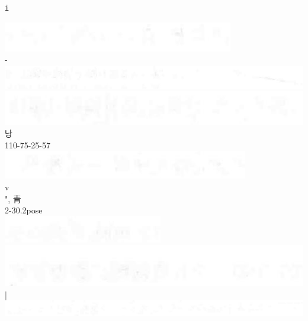 \documentclass[10pt]{article}
\begin{document}
\begin{verbatim}
i
\end{verbatim}

\includegraphics[max width=\textwidth, center]{2025_06_06_704745ea57b15b2333e5g-111(20)}\\
-\\
\includegraphics[max width=\textwidth, center]{2025_06_06_704745ea57b15b2333e5g-111(9)}\\
\includegraphics[max width=\textwidth, center]{2025_06_06_704745ea57b15b2333e5g-111(12)}\\
낭\\
110-75-25-57\\
\includegraphics[max width=\textwidth, center]{2025_06_06_704745ea57b15b2333e5g-111(17)}\\
v\\
", 青\\
2-30.2pose\\
\includegraphics[max width=\textwidth, center]{2025_06_06_704745ea57b15b2333e5g-111(11)}\\
\includegraphics[max width=\textwidth, center]{2025_06_06_704745ea57b15b2333e5g-111(7)}\\
|\\
\includegraphics[max width=\textwidth, center]{2025_06_06_704745ea57b15b2333e5g-111(1)}\\
\end{document}
